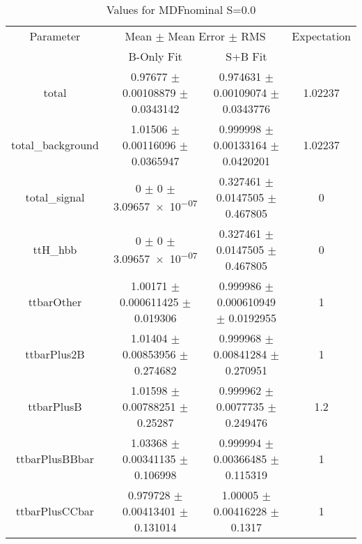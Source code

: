 \begin{table}
\centering
\caption{Values for MDFnominal S=0.0}
\begin{tabular}{cccc}
\toprule
Parameter & \multicolumn{2}{c}{Mean $\pm$ Mean Error $\pm$ RMS} & Expectation\\
 & B-Only Fit & S+B Fit & \\
\midrule
total & \num{0.97677} $\pm$ \num{0.00108879} $\pm$ \num{0.0343142} & \num{0.974631} $\pm$ \num{0.00109074} $\pm$ \num{0.0343776} & \num{1.02237}\\
total\_background & \num{1.01506} $\pm$ \num{0.00116096} $\pm$ \num{0.0365947} & \num{0.999998} $\pm$ \num{0.00133164} $\pm$ \num{0.0420201} & \num{1.02237}\\
total\_signal & \num{0} $\pm$ \num{0} $\pm$ \num{3.09657e-07} & \num{0.327461} $\pm$ \num{0.0147505} $\pm$ \num{0.467805} & \num{0}\\
ttH\_hbb & \num{0} $\pm$ \num{0} $\pm$ \num{3.09657e-07} & \num{0.327461} $\pm$ \num{0.0147505} $\pm$ \num{0.467805} & \num{0}\\
ttbarOther & \num{1.00171} $\pm$ \num{0.000611425} $\pm$ \num{0.019306} & \num{0.999986} $\pm$ \num{0.000610949} $\pm$ \num{0.0192955} & \num{1}\\
ttbarPlus2B & \num{1.01404} $\pm$ \num{0.00853956} $\pm$ \num{0.274682} & \num{0.999968} $\pm$ \num{0.00841284} $\pm$ \num{0.270951} & \num{1}\\
ttbarPlusB & \num{1.01598} $\pm$ \num{0.00788251} $\pm$ \num{0.25287} & \num{0.999962} $\pm$ \num{0.0077735} $\pm$ \num{0.249476} & \num{1.2}\\
ttbarPlusBBbar & \num{1.03368} $\pm$ \num{0.00341135} $\pm$ \num{0.106998} & \num{0.999994} $\pm$ \num{0.00366485} $\pm$ \num{0.115319} & \num{1}\\
ttbarPlusCCbar & \num{0.979728} $\pm$ \num{0.00413401} $\pm$ \num{0.131014} & \num{1.00005} $\pm$ \num{0.00416228} $\pm$ \num{0.1317} & \num{1}\\
\bottomrule
\end{tabular}
\end{table}